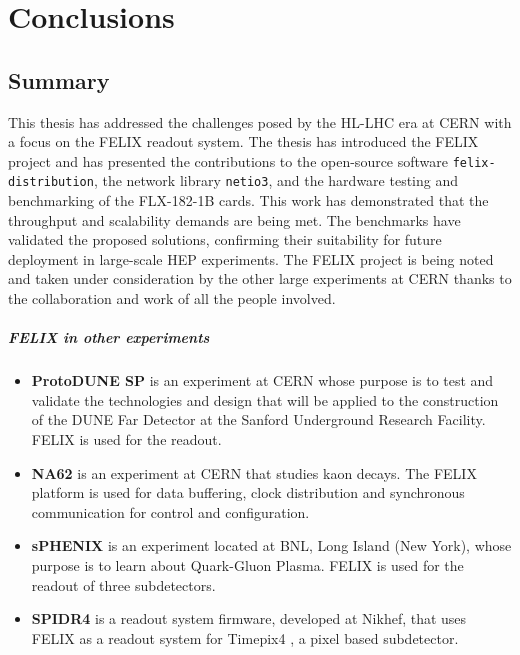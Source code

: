 \chapter{Conclusions}

\section{Summary}
This thesis has addressed the challenges posed by the \acl{HL-LHC} era at \acs{CERN} with a focus on the \acs{FELIX} readout system. The thesis has introduced the \acs{FELIX} project and has presented the contributions to the open-source software \texttt{felix-distribution}, the network library \texttt{netio3}, and the hardware testing and benchmarking of the FLX-182-1B cards. This work has demonstrated that the throughput and scalability demands are being met. The benchmarks have validated the proposed solutions, confirming their suitability for future deployment in large-scale \acs{HEP} experiments. The \acs{FELIX} project is being noted and taken under consideration by the other large experiments at \acs{CERN} thanks to the collaboration and work of all the people involved.

\paragraph{\acs{FELIX} in other experiments}
\begin{itemize}
    \item \textbf{ProtoDUNE SP} \cite{protodune} is an experiment at \acs{CERN} whose purpose is to test and validate the technologies and design that will be applied to the construction of the \acs{DUNE} Far Detector at the Sanford Underground Research Facility. \acs{FELIX} is used for the readout.

    \item \textbf{NA62} \cite{protodune, Martellotti:2056863} is an experiment at \acs{CERN} that studies kaon decays. The \acs{FELIX} platform is used for data buffering, clock distribution and synchronous communication for control and configuration.

    \item \textbf{sPHENIX} \cite{sphenix} is an experiment located at \acl{BNL}, Long Island (New York), whose purpose is to learn about Quark-Gluon Plasma. \acs{FELIX} is used for the readout of three subdetectors.

    \item \textbf{SPIDR4} \cite{spidr4} is a readout system firmware, developed at Nikhef, that uses \acs{FELIX} as a readout system for Timepix4 \cite{timepix4}, a pixel based subdetector. 
\end{itemize}

